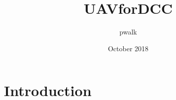 \documentclass{article}
\title{UAVforDCC}
\author{pwalk }
\date{October 2018}
\begin{document}
\maketitle

\section{Introduction}
\end{document}

